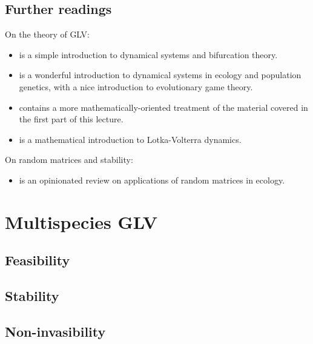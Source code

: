 \documentclass[]{book}
\providecommand{\tightlist}{%
  \setlength{\itemsep}{0pt}\setlength{\parskip}{0pt}}
\begin{document}
\hypertarget{further-readings}{%
\section{Further readings}\label{further-readings}}

On the theory of GLV:

\begin{itemize}
\item
  \citet{strogatz2018nonlinear} is a simple introduction to dynamical systems and bifurcation theory.
\item
  \citet{hofbauer1998evolutionary} is a wonderful introduction to dynamical systems in ecology and population genetics, with a nice introduction to evolutionary game theory.
\item
  \citet{hadeler2017topics} contains a more mathematically-oriented treatment of the material covered in the first part of this lecture.
\item
  \citet{baigent2016lotka} is a mathematical introduction to Lotka-Volterra dynamics.
\end{itemize}

On random matrices and stability:

\begin{itemize}
\tightlist
\item
  \citet{allesina2015stability} is an opinionated review on applications of random matrices in ecology.
\end{itemize}

\hypertarget{multi}{%
\chapter{Multispecies GLV}\label{multi}}

\hypertarget{feasibility}{%
\section{Feasibility}\label{feasibility}}

\hypertarget{stability}{%
\section{Stability}\label{stability}}

\hypertarget{non-invasibility}{%
\section{Non-invasibility}\label{non-invasibility}}
\end{document}
